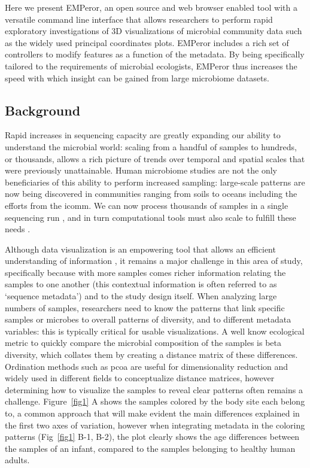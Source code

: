 Here we present EMPeror, an open source and web browser enabled tool with a versatile command line interface that allows researchers to perform rapid exploratory investigations of 3D visualizations of microbial community data such as the widely used principal coordinates plots. EMPeror includes a rich set of controllers to modify features as a function of the metadata. By being specifically tailored to the requirements of microbial ecologists, EMPeror thus increases the speed with which insight can be gained from large microbiome datasets.

\subsection{Background}

Rapid increases in sequencing capacity are greatly expanding our ability to understand the microbial world: scaling from a handful of samples to hundreds, or thousands, allows a rich picture of trends over temporal and spatial scales that were previously unattainable. Human microbiome studies are not the only beneficiaries of this ability to perform increased sampling: large\hyp{}scale patterns are now being discovered in communities ranging from soils \cite{RN108} to oceans \cite{RN115} including the efforts from the \gls{icomm}.  We can now process thousands of samples in a single sequencing run \cite{RN85}, and in turn computational tools must also scale to fulfill these needs \cite{RN53}.

Although data visualization is an empowering tool that allows an efficient understanding of information \cite{RN126}, it remains a major challenge in this area of study, specifically because with more samples comes richer information relating the samples to one another (this contextual information is often referred to as `sequence metadata') and to the study design itself. When analyzing large numbers of samples, researchers need to know the patterns that link specific samples or microbes to overall patterns of diversity, and to different metadata variables: this is typically critical for usable visualizations. A well know ecological metric to quickly compare the microbial composition of the samples is beta diversity, which collates them by creating a distance matrix of these differences. Ordination methods such as \gls{pcoa} \cite{RN109} are useful for dimensionality reduction and widely used in different fields to conceptualize distance matrices, however determining how to visualize the samples to reveal clear patterns often remains a challenge. Figure~\ref{fig1} A shows the samples colored by the body site each belong to, a common approach that will make evident the main differences explained in the first two axes of variation, however when integrating metadata in the coloring patterns  (Fig~\ref{fig1} B\hyp{}1, B\hyp{}2), the plot clearly shows the age differences between the samples of an infant, compared to the samples belonging to healthy human adults.

